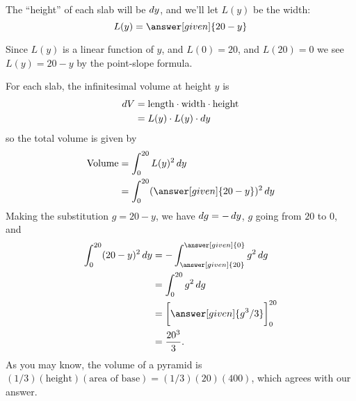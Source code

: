 \documentclass{ximera}
\begin{document}
\begin{example}
\begin{explanation}
\begin{image}
\end{image}
The ``height'' of each slab will be $\mathop{}\!d y$, and we'll let $L(y)$ be the width:
\[
L(y) = \answer[given]{20-y}
\]
\begin{hint}
  Since $L(y)$ is a linear function of $y$, and $L(0) = 20$, and
  $L(20) = 0$ we see $L(y) = 20-y$ by the point-slope formula.
\end{hint}
For each slab, the infinitesimal volume at height $y$ is
\begin{align*}
  \mathop{}\!d V &= \mathrm{length} \cdot \mathrm{width}\cdot \mathrm{height}\\
  &= L(y)\cdot L(y)\cdot  \mathop{}\!d y
\end{align*}
so the total volume is given by
\begin{align*}
  \mathrm{Volume} &= \int_0^{20} L(y)^2 \d y \\
  &= \int_0^{20} (\answer[given]{20-y})^2 \d y
\end{align*}
Making the substitution $g = 20-y $, we have $\mathop{}\!d g = - \mathop{}\!d y$, $g$ going from $20$ to $0$, and 
	\begin{align*}
	\int_0^{20} (20-y)^2 \d y &= -\int_{\answer[given]{20}}^{\answer[given]{0}} g^2 \d g\\
		&= \int_0^{20} g^2 \d g\\
		&= \eval{\answer[given]{g^3/3}}_0^{20}\\
		&= \frac{20^3}{3}.
	\end{align*}
As you may know, the volume of a pyramid is
$(1/3)(\text{height})(\text{area of base})=(1/3)(20)(400)$, which
agrees with our answer.
\end{explanation}
\end{example}
\end{document}

